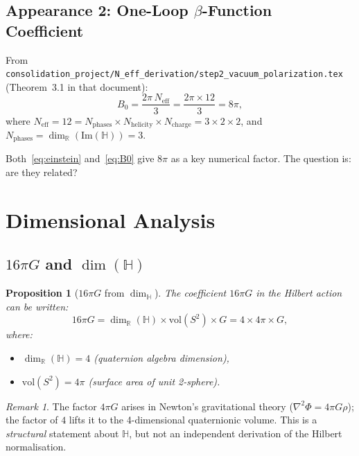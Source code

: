 \documentclass[12pt,a4paper]{article}
\newtheorem{proposition}[theorem]{Proposition}
\theoremstyle{definition}
\theoremstyle{remark}
\newtheorem{remark}[theorem]{Remark}
\begin{document}
\subsection{Appearance 2: One-Loop $\beta$-Function Coefficient}

From \texttt{consolidation\_project/N\_eff\_derivation/step2\_vacuum\_polarization.tex}
(Theorem~3.1 in that document):
\begin{equation}
  B_0 = \frac{2\pi\,N_{\mathrm{eff}}}{3} = \frac{2\pi\times 12}{3} = 8\pi,
\label{eq:B0}
\end{equation}
where $N_{\mathrm{eff}} = 12 = N_{\mathrm{phases}}\times N_{\mathrm{helicity}}
\times N_{\mathrm{charge}} = 3\times 2\times 2$,
and $N_{\mathrm{phases}} = \dim_{\mathbb{R}}(\mathrm{Im}(\mathbb{H})) = 3$.

Both~\eqref{eq:einstein} and~\eqref{eq:B0} give $8\pi$ as a key numerical
factor.  The question is: are they related?

\section{Dimensional Analysis}
\label{sec:dimensional}

\subsection{$16\pi G$ and $\dim(\mathbb{H})$}

\begin{proposition}[$16\pi G$ from $\dim_{\mathbb{H}}$]
\label{prop:16piG}
The coefficient $16\pi G$ in the Hilbert action can be written:
\begin{equation}
  16\pi G = \dim_{\mathbb{R}}(\mathbb{H}) \times \mathrm{vol}(S^2) \times G
          = 4 \times 4\pi \times G,
\label{eq:16piG}
\end{equation}
where:
\begin{itemize}
  \item $\dim_{\mathbb{R}}(\mathbb{H}) = 4$ (quaternion algebra dimension),
  \item $\mathrm{vol}(S^2) = 4\pi$ (surface area of unit 2-sphere).
\end{itemize}
\end{proposition}

\begin{remark}
The factor $4\pi G$ arises in Newton's gravitational theory ($\nabla^2\Phi = 4\pi G\rho$);
the factor of $4$ lifts it to the 4-dimensional quaternionic volume.
This is a \emph{structural} statement about $\mathbb{H}$, but not an
independent derivation of the Hilbert normalisation.
\end{remark}
\end{document}
